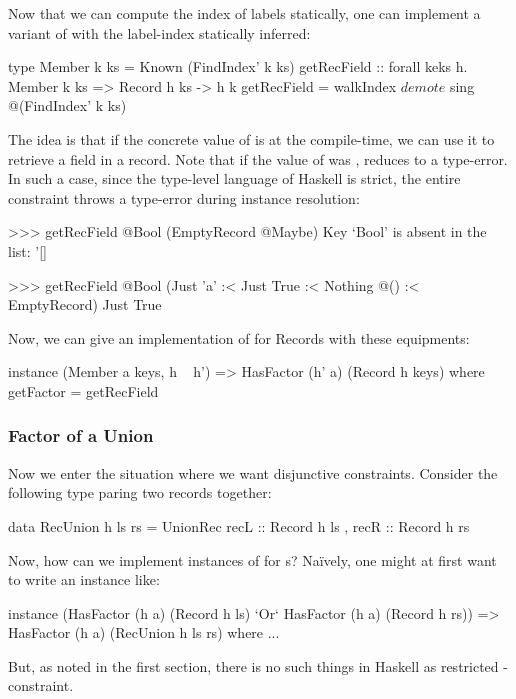\documentclass[demotion-paper.tex]{subfiles}
\begin{document}
Now that we can compute the index of labels statically, one can implement a variant of  with the label-index statically inferred:
\begin{code}
type Member k ks = Known (FindIndex' k ks)
getRecField :: forall keks h. Member k ks
  => Record h ks -> h k
getRecField = walkIndex $ 
  demote $ sing @(FindIndex' k ks)
\end{code}
The idea is that if the concrete value of  is  at the compile-time, we can use it to retrieve a field in a record.
Note that if the value of  was ,  reduces to a type-error.
In such a case, since the type-level language of Haskell is strict, the entire constraint  throws a type-error during instance resolution:
\begin{repl}
>>> getRecField @Bool (EmptyRecord @Maybe)
Key `Bool' is absent in the list: '[]

>>> getRecField @Bool (Just 'a' :< Just True
                :< Nothing @() :< EmptyRecord)
Just True
\end{repl}

Now, we can give an implementation of  for Records with these equipments:
\begin{code}
instance (Member a keys, h ~ h')
      => HasFactor (h' a) (Record h keys) where
  getFactor = getRecField
\end{code}

\subsubsection{Factor of a Union}
Now we enter the situation where we want disjunctive constraints.
Consider the following type paring two records together:
\begin{code}
data RecUnion h ls rs = 
  UnionRec { recL :: Record h ls
           , recR :: Record h rs }
\end{code}
Now, how can we implement instances of  for s?
Na\"{i}vely, one might at first want to write an instance like:
\begin{code}
instance (HasFactor (h a) (Record h ls)
          `Or` HasFactor (h a) (Record h rs))
  => HasFactor (h a) (RecUnion h ls rs) where ...
\end{code}
But, as noted in the first section, there is no such things in Haskell as restricted -constraint.
\end{document}
